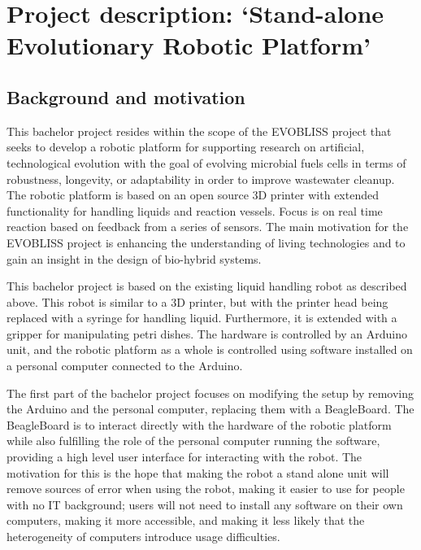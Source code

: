 \documentclass[a4paper,11pt]{article}
\begin{document}
\section{Project description: `Stand-alone Evolutionary Robotic Platform'}

\subsection{Background and motivation}
This bachelor project resides within the scope of the EVOBLISS project
that seeks to develop a robotic platform for supporting research on
artificial, technological evolution with the goal of evolving microbial
fuels cells in terms of robustness, longevity, or adaptability in order
to improve wastewater cleanup. The robotic platform is based on an open
source 3D printer with extended functionality for handling liquids and
reaction vessels. Focus is on real time reaction based on feedback from
a series of sensors. The main motivation for the EVOBLISS project is
enhancing the understanding of living technologies and to gain an
insight in the design of bio-hybrid systems.

This bachelor project is based on the existing liquid handling robot as
described above. This robot is similar to a 3D printer, but with the
printer head being replaced with a syringe for handling liquid.
Furthermore, it is extended with a gripper for manipulating petri
dishes. The hardware is controlled by an Arduino unit, and the robotic
platform as a whole is controlled using software installed on a personal
computer connected to the Arduino.

The first part of the bachelor project focuses on modifying the setup by
removing the Arduino and the personal computer, replacing them with a
BeagleBoard. The BeagleBoard is to interact directly with the hardware
of the robotic platform while also fulfilling the role of the personal
computer running the software, providing a high level user interface for
interacting with the robot. The motivation for this is the hope that
making the robot a stand alone unit will remove sources of error when
using the robot, making it easier to use for people with no IT
background; users will not need to install any software on their own
computers, making it more accessible, and making it less likely that the
heterogeneity of computers introduce usage difficulties.
\end{document}
